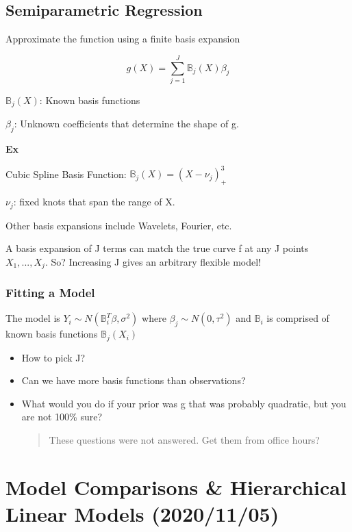 \documentclass[11pt]{article}
\begin{document}
\subsection{Semiparametric Regression}
\label{sec:org48e766e}

Approximate the function using a finite basis expansion

$$
g(X) = \sum_{j = 1}^{J} \mathbb{B}_j (X) \beta_j
$$

\(\mathbb{B}_j (X)\): Known basis functions

\(\beta_j\): Unknown coefficients that determine the shape of g.

\textbf{Ex}

Cubic Spline Basis Function: \(\mathbb{B}_j (X) = (X - \nu_j)^3_+\)

\(\nu_j\): fixed knots that span the range of X.


Other basis expansions include Wavelets, Fourier, etc.

A basis expansion of J terms can match the true curve f at any J points \(X_1,
..., X_j\). So? Increasing J gives an arbitrary flexible model!

\subsubsection{Fitting a Model}
\label{sec:orgd26ca40}

The model is \(Y_i \sim N(\mathbb{B}^T_i \beta, \sigma^2)\) where \(\beta_j \sim
N(0, \tau^2)\) and \(\mathbb{B}_i\) is comprised of known basis functions \(\mathbb B_j (X_i)\)

\begin{itemize}
\item How to pick J?

\item Can we have more basis functions than observations?

\item What would you do if your prior was g that was probably quadratic, but you are
not 100\% sure?

\begin{quote}
These questions were not answered. Get them from office hours?
\end{quote}
\end{itemize}
\section{Model Comparisons \& Hierarchical Linear Models (2020/11/05)}
\label{sec:org5a01d08}
\end{document}
